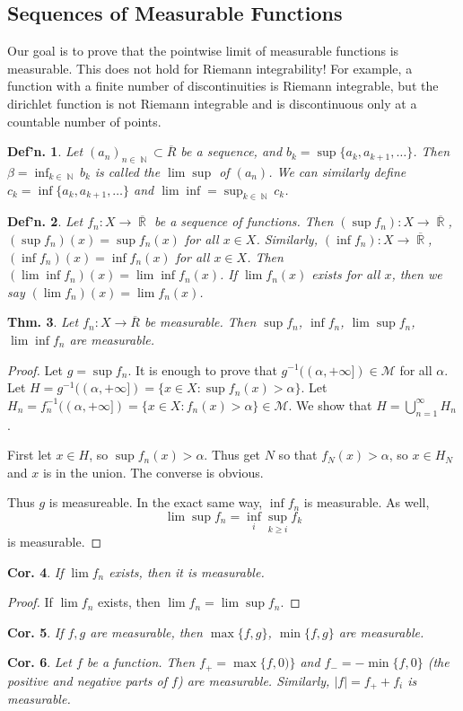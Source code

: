 \documentclass[12pt, a4paper]{book}
\DeclareMathOperator{\N}{\mathbb{N}}
\DeclareMathOperator{\R}{\mathbb{R}}
\newtheorem{theorem}{Thm.}[section]
\newtheorem{definition}[theorem]{Def'n.}
\newtheorem{corollary}[theorem]{Cor.}
\theoremstyle{nonumberplain}
\newtheorem{proof}{Proof}
\begin{document}
\subsection{Sequences of Measurable Functions}
Our goal is to prove that the pointwise limit of measurable functions is measurable.
This does not hold for Riemann integrability!
For example, a function with a finite number of discontinuities is Riemann integrable, but the dirichlet function is not Riemann integrable and is discontinuous only at a countable number of points.
\begin{definition}
    Let $(a_n)_{n\in\N}\subset\overline{R}$ be a sequence, and $b_k=\sup\{a_k,a_{k+1},\ldots\}$.
    Then $\beta=\inf_{k\in\N}b_k$ is called the $\lim\sup$ of $(a_n)$.
    We can similarly define $c_k=\inf\{a_k,a_{k+1},\ldots\}$ and $\lim\inf=\sup_{k\in\N}c_k$.
\end{definition}
\begin{definition}
    Let $f_n:X\to\overline{\R}$ be a sequence of functions.
    Then $(\sup f_n):X\to\overline{\R}$, $(\sup f_n)(x)=\sup f_n(x)$ for all $x\in X$.
    Similarly, $(\inf f_n):X\to\overline{\R}$, $(\inf f_n)(x)=\inf f_n(x)$ for all $x\in X$.
    Then $(\lim\inf f_n)(x)=\lim\inf f_n(x)$.
    If $\lim f_n(x)$ exists for all $x$, then we say $(\lim f_n)(x)=\lim f_n(x)$.
\end{definition}
\begin{theorem}
    Let $f_n:X\to\overline{R}$ be measurable.
    Then $\sup f_n$, $\inf f_n$, $\lim\sup f_n$, $\lim\inf f_n$ are measurable.
\end{theorem}
\begin{proof}
    Let $g=\sup f_n$.
    It is enough to prove that $g^{-1}((\alpha,+\infty])\in\mathcal{M}$ for all $\alpha$.
    Let $H=g^{-1}((\alpha,+\infty])=\{x\in X:\sup f_n(x)>\alpha\}$.
    Let $H_n=f_n^{-1}((\alpha,+\infty])=\{x\in X:f_n(x)>\alpha\}\in\mathcal{M}$.
    We show that $H=\bigcup\limits_{n=1}^\infty H_n$.

    First let $x\in H$, so $\sup f_n(x)>\alpha$.
    Thus get $N$ so that $f_N(x)>\alpha$, so $x\in H_N$ and $x$ is in the union.
    The converse is obvious.

    Thus $g$ is measureable.
    In the exact same way, $\inf f_n$ is measurable.
    As well,
    \[\lim\sup f_n=\inf_i\sup_{k\geq i}f_k\]
    is measurable.
\end{proof}
\begin{corollary}
    If $\lim f_n$ exists, then it is measurable.
\end{corollary}
\begin{proof}
    If $\lim f_n$ exists, then $\lim f_n=\lim\sup f_n$.
\end{proof}
\begin{corollary}
    If $f,g$ are measurable, then $\max\{f,g\}$, $\min\{f,g\}$ are measurable.
\end{corollary}
\begin{corollary}
    Let $f$ be a function.
    Then $f_+=\max\{f,0)\}$ and $f_-=-\min\{f,0\}$ (the positive and negative parts of $f$) are measurable.
    Similarly, $|f|=f_++f_i$ is measurable.
\end{corollary}
\end{document}
